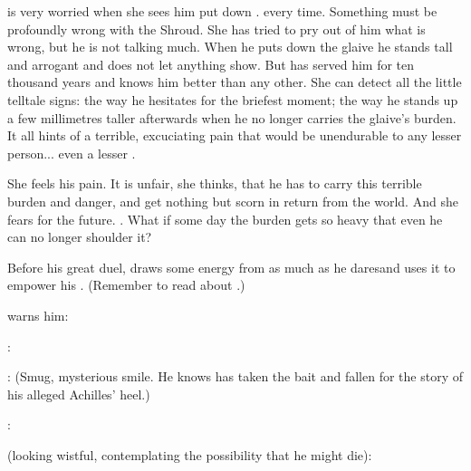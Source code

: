 \begin{garbage}
\Criseis{} is very worried when she sees him put down \Rystessakhin. 
 every time. 
Something must be profoundly wrong with the Shroud. 
She has tried to pry out of him what is wrong, but he is not talking much. 
When he puts down the glaive he stands tall and arrogant and does not let anything show. 
But \Criseis{} has served him for ten thousand years and knows him better than any other. 
She can detect all the little telltale signs: 
the way he hesitates for the briefest moment; the way he stands up a few millimetres taller afterwards when he no longer carries the glaive's burden. 
It all hints of a terrible, excuciating pain that would be unendurable to any lesser person... even a lesser \dragon. 

She feels his pain. 
It is unfair, she thinks, that he has to carry this terrible burden and danger, and get nothing but scorn in return from the world. 
And she fears for the future. 
. 
What if some day the burden gets so heavy that even he can no longer shoulder it? 

Before his great duel, \Ishnaruchaefir{} draws some energy from \Rystessakhin \dash as much as he dares\dash and uses it to empower his . 
(Remember to read about .)

\Criseis{} warns him:

\begin{prose}
  \Criseis:
  
  \Ishnaruchaefir:
  (Smug, mysterious smile.
  He knows \Teshrial{} has taken the bait and fallen for the story of his alleged Achilles' heel.)
  
  \Criseis:
  
  \Ishnaruchaefir{} (looking wistful, contemplating the possibility that he might die):
\end{prose}






\end{garbage}
